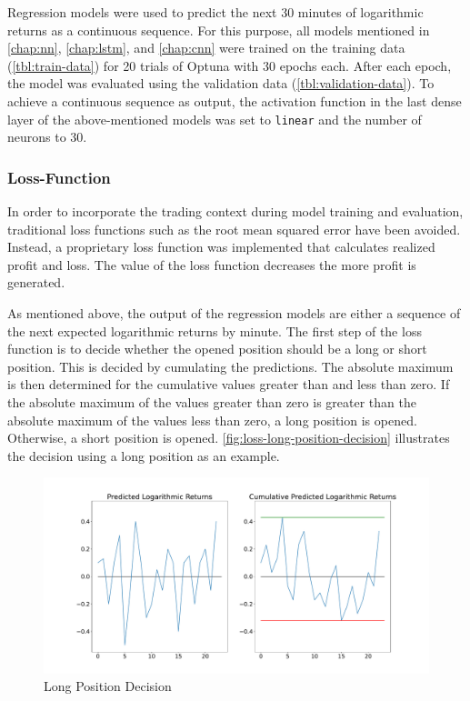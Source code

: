 Regression models were used to predict the next 30 minutes of logarithmic returns as a continuous sequence.
For this purpose, all models mentioned in \autoref{chap:nn}, \autoref{chap:lstm}, and \autoref{chap:cnn} were trained on the training data (\autoref{tbl:train-data}) for 20 trials of Optuna with 30 epochs each.
After each epoch, the model was evaluated using the validation data (\autoref{tbl:validation-data}).
To achieve a continuous sequence as output, the activation function in the last dense layer of the above-mentioned models was set to \verb|linear| and the number of neurons to 30.

\subsubsection{Loss-Function}
\label{chap:regression-loss}

In order to incorporate the trading context during model training and evaluation, traditional loss functions such as the root mean squared error have been avoided.
Instead, a proprietary loss function was implemented that calculates realized profit and loss.
The value of the loss function decreases the more profit is generated.

As mentioned above, the output of the regression models are either a sequence of the next expected logarithmic returns by minute.
The first step of the loss function is to decide whether the opened position should be a long or short position.
This is decided by cumulating the predictions.
The absolute maximum is then determined for the cumulative values greater than and less than zero.
If the absolute maximum of the values greater than zero is greater than the absolute maximum of the values less than zero, a long position is opened.
Otherwise, a short position is opened.
\autoref{fig:loss-long-position-decision} illustrates the decision using a long position as an example.

\begin{figure}[H]
    \centering
    \includegraphics[width=\textwidth]{images/models/loss_direction}
    \caption{Long Position Decision}
    \label{fig:loss-long-position-decision}
\end{figure}

